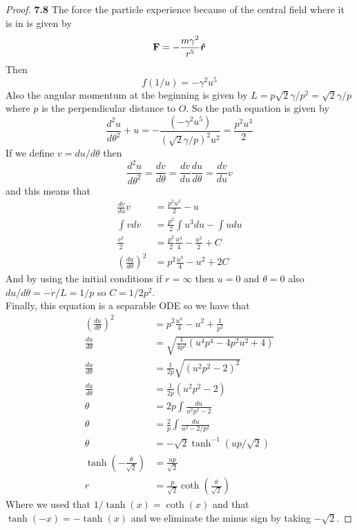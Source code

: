 \documentclass[11pt]{article}
\newcommand{\hatr}{\bm{\hat{r}}}
\theoremstyle{definition}
\begin{document}
	\begin{proof}{\textbf{7.8}}
        The force the particle experience because of the central field where it is in
        is given by
        $$\vectorbold{F} = - \frac{m\gamma^2}{r^5} \hatr$$
        Then
        $$f(1/u) = -\gamma^2u^5$$
        Also the angular momentum at the beginning is given by
        $L = p\sqrt{2}\gamma /p^2 = \sqrt{2}\gamma / p$
        where $p$ is the perpendicular distance to $O$.
        So the path equation is given by
        $$\frac{d^2u}{d\theta^2} + u = -\frac{(-\gamma^2u^5)}{(\sqrt{2}\gamma / p)^2u^2} =
        \frac{p^2u^3}{2}$$
        If we define $v = du/d\theta$ then
        $$\frac{d^2u}{d\theta^2} = \frac{dv}{d\theta} = \frac{dv}{du}\frac{du}{d\theta}
        = \frac{dv}{du}v$$
        and this means that
        \begin{align*}
            \frac{dv}{du}v &= \frac{p^2u^3}{2} - u\\
            \int v dv &= \frac{p^2}{2}\int u^3 du - \int u du\\
            \frac{v^2}{2} &= \frac{p^2}{2} \frac{u^4}{4} - \frac{u^2}{2} +C\\
            \left(\frac{du}{d\theta}\right)^2 &= p^2\frac{u^4}{4} - u^2 + 2C
        \end{align*}
        And by using the initial conditions if $r = \infty$ then $u = 0$ and $\theta = 0$
        also $du/d\theta = -\dot{r}/L = 1/p$ so $C = 1/2p^2$.\\
        Finally, this equation is a separable ODE so we have that 
        \begin{align*}
            \left(\frac{du}{d\theta}\right)^2 &= p^2\frac{u^4}{4} - u^2 + \frac{1}{p^2}\\
            \frac{du}{d\theta} &= \sqrt{\frac{1}{4p^2} (u^4p^4 - 4p^2u^2 + 4)}\\
            \frac{du}{d\theta} &=\frac{1}{2p} \sqrt{(u^2p^2 - 2)^2}\\
            \frac{du}{d\theta} &=\frac{1}{2p} (u^2p^2 - 2)\\
            \theta &= 2p \int \frac{du}{u^2p^2 - 2}\\
            \theta &= \frac{2}{p} \int \frac{du}{u^2 - 2/p^2}\\
            \theta &= -\sqrt{2}\tanh^{-1}(up/\sqrt{2})\\
            \tanh(-\frac{\theta}{\sqrt{2}}) &= \frac{up}{\sqrt{2}}\\
            r &= \frac{p}{\sqrt{2}}\coth(\frac{\theta}{\sqrt{2}})
        \end{align*}
        Where we used that $1/\tanh(x) = \coth(x)$ and that $\tanh(-x) = -\tanh(x)$ and
        we eliminate the minus sign by taking $-\sqrt{2}$. 
    \end{proof}
\end{document}
